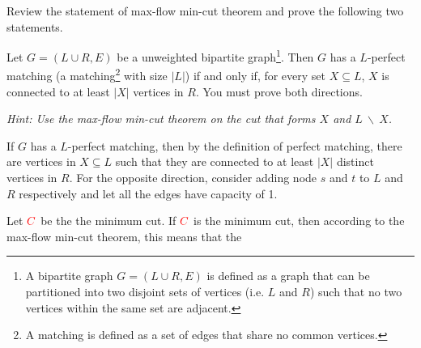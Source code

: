 \documentclass[11pt]{article}
\begin{document}
Review the statement of max-flow min-cut theorem and prove the following two statements. 
\begin{subparts}
 \subpart   
Let $G = (L \cup R,E)$ be a unweighted bipartite graph\footnote{A bipartite graph $G = (L \cup R, E)$ is defined as a graph that can be partitioned into two disjoint sets of vertices (i.e. $L$ and $R$) such that no two vertices within the same set are adjacent.  
}. Then $G$ has a $L$-perfect
matching (a matching\footnote{A matching is defined as a set of edges that share no common vertices.} with size $|L|$) if and only if, for every set $X \subseteq L$, $X$ is connected to at least $|X|$ vertices
in $R$. You must prove both directions. 

\textit{Hint: Use the max-flow min-cut theorem on the cut that forms $X$ and $L \ \backslash \ X$.}\\
\begin{solution}
    If $G$ has a $L$-perfect matching, then by the definition of perfect matching, there are vertices 
    in $X \subseteq L$ such that they are connected to at least $|X|$ distinct vertices in $R$.
    For the opposite direction, consider adding node $s$ and $t$ to $L$ and $R$ respectively and let all the edges have capacity of 1.
    \begin{center}
    \end{center}
    Let $\color{red} C$ be the the minimum cut. If $\color{red} C$ is the minimum
    cut, then according to the max-flow min-cut theorem, this means that the

\end{solution}
\end{subparts}
\end{document}

